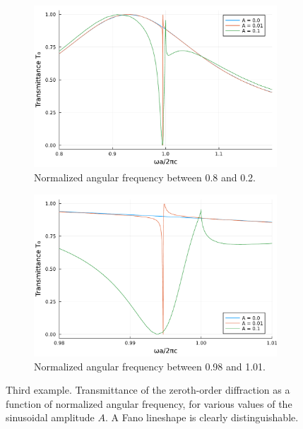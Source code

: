 \documentclass[reprint,amsmath,amssymb,
 aps]{revtex4-2}
\begin{document}
\begin{figure}[h!]
\begin{subfigure}{.5\textwidth}
\includegraphics[width=0.6\columnwidth]{figures/ex4_fano_v1.pdf}
  \caption{Normalized angular frequency between 0.8 and 0.2.}
\label{fig:ex4_fano_v1}
\end{subfigure}
\begin{subfigure}{.5\textwidth}
\includegraphics[width=0.6\columnwidth]{figures/ex4_fano_v2.pdf}
  \caption{Normalized angular frequency between 0.98 and 1.01.}
\label{fig:ex4_fano_v2}
\end{subfigure}
\caption{Third example. Transmittance of the zeroth-order diffraction as a function of normalized angular frequency, for various values of the sinusoidal amplitude $A$. A Fano lineshape is clearly distinguishable.}
\label{fig:ex4_fano}
\end{figure}
\end{document}
